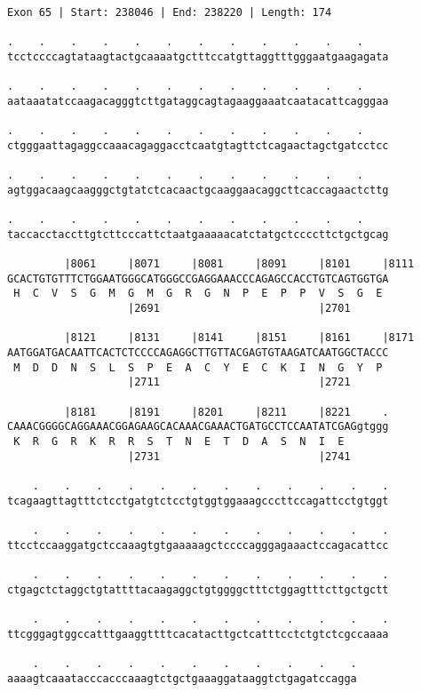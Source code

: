 \documentclass{article}
\begin{document}
\newpage
\begin{Verbatim}[fontfamily=courier]
Exon 65 | Start: 238046 | End: 238220 | Length: 174

.    .    .    .    .    .    .    .    .    .    .    .    
tcctccccagtataagtactgcaaaatgctttccatgttaggtttgggaatgaagagata

.    .    .    .    .    .    .    .    .    .    .    .    
aataaatatccaagacagggtcttgataggcagtagaaggaaatcaatacattcagggaa

.    .    .    .    .    .    .    .    .    .    .    .    
ctgggaattagaggccaaacagaggacctcaatgtagttctcagaactagctgatcctcc

.    .    .    .    .    .    .    .    .    .    .    .    
agtggacaagcaagggctgtatctcacaactgcaaggaacaggcttcaccagaactcttg

.    .    .    .    .    .    .    .    .    .    .    .    
taccacctaccttgtcttcccattctaatgaaaaacatctatgctccccttctgctgcag

         |8061     |8071     |8081     |8091     |8101     |8111
GCACTGTGTTTCTGGAATGGGCATGGGCCGAGGAAACCCAGAGCCACCTGTCAGTGGTGA
 H  C  V  S  G  M  G  M  G  R  G  N  P  E  P  P  V  S  G  E 
                   |2691                         |2701      

         |8121     |8131     |8141     |8151     |8161     |8171
AATGGATGACAATTCACTCTCCCCAGAGGCTTGTTACGAGTGTAAGATCAATGGCTACCC
 M  D  D  N  S  L  S  P  E  A  C  Y  E  C  K  I  N  G  Y  P 
                   |2711                         |2721      

         |8181     |8191     |8201     |8211     |8221     .
CAAACGGGGCAGGAAACGGAGAAGCACAAACGAAACTGATGCCTCCAATATCGAGgtggg
 K  R  G  R  K  R  R  S  T  N  E  T  D  A  S  N  I  E       
                   |2731                         |2741      

    .    .    .    .    .    .    .    .    .    .    .    .
tcagaagttagtttctcctgatgtctcctgtggtggaaagcccttccagattcctgtggt

    .    .    .    .    .    .    .    .    .    .    .    .
ttcctccaaggatgctccaaagtgtgaaaaagctccccagggagaaactccagacattcc

    .    .    .    .    .    .    .    .    .    .    .    .
ctgagctctaggctgtattttacaagaggctgtggggctttctggagtttcttgctgctt

    .    .    .    .    .    .    .    .    .    .    .    .
ttcgggagtggccatttgaaggttttcacatacttgctcatttcctctgtctcgccaaaa

    .    .    .    .    .    .    .    .    .    .    .
aaaagtcaaatacccacccaaagtctgctgaaaggataaggtctgagatccagga
\end{Verbatim}
\end{document}
